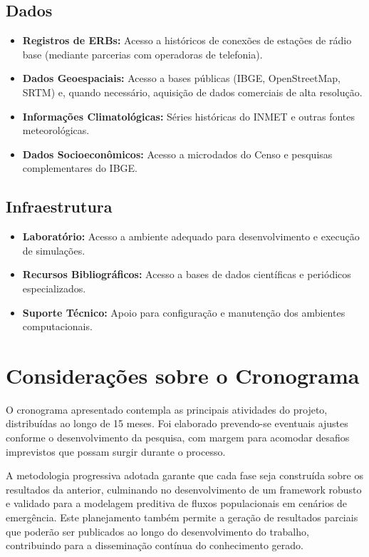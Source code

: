 \subsection{Dados}
\begin{itemize}[noitemsep]
    \item \textbf{Registros de \gls{ERB}s:} Acesso a históricos de conexões de estações de rádio base (mediante parcerias com operadoras de telefonia).
    
    \item \textbf{Dados Geoespaciais:} Acesso a bases públicas (IBGE, OpenStreetMap, SRTM) e, quando necessário, aquisição de dados comerciais de alta resolução.
    
    \item \textbf{Informações Climatológicas:} Séries históricas do INMET e outras fontes meteorológicas.
    
    \item \textbf{Dados Socioeconômicos:} Acesso a microdados do Censo e pesquisas complementares do IBGE.
\end{itemize}

\subsection{Infraestrutura}
\begin{itemize}[noitemsep]
    \item \textbf{Laboratório:} Acesso a ambiente adequado para desenvolvimento e execução de simulações.
    
    \item \textbf{Recursos Bibliográficos:} Acesso a bases de dados científicas e periódicos especializados.
    
    \item \textbf{Suporte Técnico:} Apoio para configuração e manutenção dos ambientes computacionais.
\end{itemize}

\section{Considerações sobre o Cronograma}
O cronograma apresentado contempla as principais atividades do projeto, distribuídas ao longo de 15 meses. Foi elaborado prevendo-se eventuais ajustes conforme o desenvolvimento da pesquisa, com margem para acomodar desafios imprevistos que possam surgir durante o processo. 

A metodologia progressiva adotada garante que cada fase seja construída sobre os resultados da anterior, culminando no desenvolvimento de um framework robusto e validado para a modelagem preditiva de fluxos populacionais em cenários de emergência. Este planejamento também permite a geração de resultados parciais que poderão ser publicados ao longo do desenvolvimento do trabalho, contribuindo para a disseminação contínua do conhecimento gerado. 